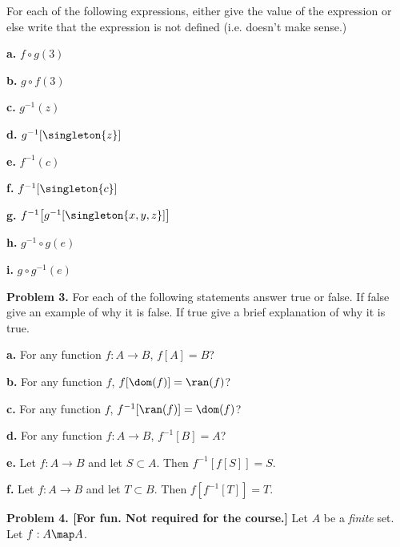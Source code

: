 \documentclass[oneside,12pt]{amsart}
\begin{document}
For each of the following expressions, either give the value of the expression
or else write that the expression is not defined (i.e. doesn't make sense.)

\textbf{a.} $f\circ g (3)$

\medskip

\textbf{b.} $g\circ f (3)$

\medskip

\textbf{c.} $g^{-1}(z)$

\medskip

\textbf{d.} $g^{-1}[\singleton{z}]$

\medskip

\textbf{e.} $f^{-1}(c)$

\medskip

\textbf{f.} $f^{-1}[\singleton{c}]$

\medskip

\textbf{g.} $f^{-1}\big[g^{-1}[\singleton{x, y, z}]\big]$

\medskip

\textbf{h.} $g^{-1} \circ g (e)$

\medskip

\textbf{i.} $g \circ g^{-1} (e)$

\bigskip

\textbf{Problem 3.} For each of the following statements answer true or
false. If false give an example of why it is false. If true give a brief
explanation of why it is true.

\smallskip

\textbf{a.} For any function $f:A\to B$, $f[A] = B$?

\bigskip
\bigskip

\textbf{b.} For any function $f$, $f[\dom(f)] = \ran(f)$?

\bigskip
\bigskip

\textbf{c.} For any function $f$, $f^{-1}[\ran(f)] = \dom(f)$?

\bigskip
\bigskip

\textbf{d.} For any function  $f:A\to B$, $f^{-1}[B] = A$?

\bigskip
\bigskip

\textbf{e.} Let $f:A\to B$ and let $S\subset A$. Then $f^{-1}[f[S]] = S$.

\bigskip
\bigskip

\textbf{f.} Let $f:A\to B$ and let $T\subset B$. Then $f[f^{-1}[T]] = T$.

\bigskip

\textbf{Problem 4. [For fun. Not required for the course.]} Let $A$ be a \emph{finite} set.
Let $f : A \map A$.
\end{document}
